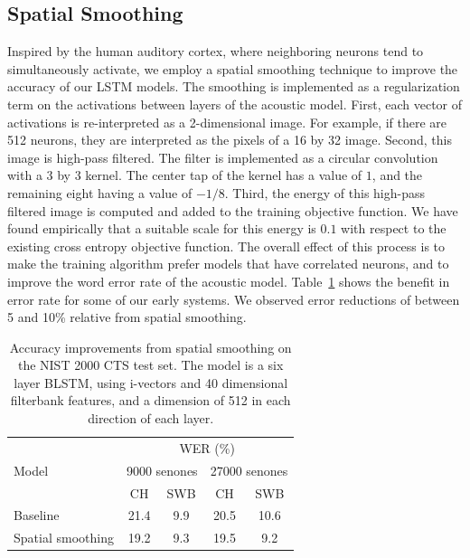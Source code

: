 \documentclass{article}
\begin{document}
\subsection{Spatial Smoothing}
Inspired by the human auditory cortex, where neighboring neurons tend to simultaneously activate, we employ a spatial smoothing technique to improve the accuracy of our LSTM models.
The smoothing is implemented as a regularization term on the activations between layers of the acoustic model.
First, each vector of activations is re-interpreted as a 2-dimensional image. For example, if there are 512 neurons, they are interpreted as the pixels of a 16 by 32 image.
Second, this image is high-pass filtered. The filter is implemented as a circular convolution with a 3 by 3 kernel. The center tap of the kernel has a value of $1$, and the remaining eight having a value of $-1/8$.
Third, the energy of this high-pass filtered image is computed and added to the training objective function. We have found empirically that a suitable scale for this energy is $0.1$ with respect to the existing cross entropy objective function.
The overall effect of this process is to make the training algorithm prefer models that have correlated neurons, and to improve the word error rate of the acoustic model.
Table~\ref{tab:spatialsmoothing} shows the benefit in error rate for some of our early systems.
We observed error reductions of between 5 and 10\% relative from spatial smoothing.
\begin{table}[t]
    \centering
\caption{Accuracy improvements from spatial smoothing on the NIST 2000 CTS test set.
The model is a six layer BLSTM, using i-vectors and 40 dimensional filterbank features, and a dimension of 512 in each direction of each layer.}
\label{tab:spatialsmoothing}
\vspace*{0.1in}
    \begin{tabular}{|l|c|c|c|c|}
    \hline 
	\multirow{3}{*}{Model} & \multicolumn{4}{c|}{WER (\%)}	\\ 
				\cline{2-5}
				& \multicolumn{2}{c|}{9000 senones} & \multicolumn{2}{c|}{27000 senones} \\
				\cline{2-5}
				& CH	& SWB	& CH	& SWB	\\ \hline
	Baseline       		& 21.4	& 9.9	& 20.5	& 10.6	\\ \hline
	Spatial smoothing    	& 19.2	& 9.3	& 19.5	& 9.2	\\ \hline
    	\end{tabular}
\end{table}
\end{document}
